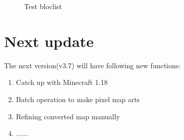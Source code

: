 \documentclass{article}
\begin{document}
    \begin{figure}[htbp]
        \centering
        \caption{Test bloclist}
        \label{testBlockListNBT}
    \end{figure}

\section{Next update}
    The next version(v3.7) will have following new functions:
    \begin{enumerate}
        \item Catch up with Minecraft 1.18
        \item Batch operation to make pixel map arts
        \item Refining converted map manually
        \item ......
    \end{enumerate}
\end{document}
